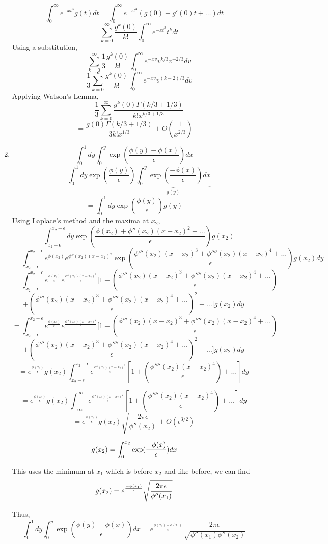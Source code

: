 \documentclass[a4paper]{article}
\begin{document}
\begin{enumerate}
	\[ \int_{0}^{\infty} e^{-xt^3}g(t)dt = \int_{0}^{\infty} e^{-xt^3}(g(0) + g'(0)t +\ldots )dt\]
	\[  = \sum_{k=0}^{\infty} \frac{g^k(0)}{k!}\int_{0}^{\infty} e^{-xt^3}t^k dt\]
Using a substitution,
		\[  = \sum_{k=0}^{\infty}\frac{1}{3} \frac{g^k(0)}{k!}\int_{0}^{\infty} e^{-xv} v^{k/3} v^{-2/3} dv\]
				\[  = \frac{1}{3}\sum_{k=0}^{\infty} \frac{g^k(0)}{k!}\int_{0}^{\infty} e^{-xv} v^{(k-2)/3}  dv\]
Applying Watson's Lemma,
				\[  = \frac{1}{3}\sum_{k=0}^{\infty} \frac{g^k(0) \Gamma(k/3 +1/3) }{k!x^{k/3+ 1/3 }}  \]
				\[  = \frac{g(0) \Gamma(k/3 +1/3 ) }{3 k! x^{1/3}} + O(\frac{1}{x^{2/3}})   \]				
\item 
\[\int_0^1 dy \int_0^y \exp(\frac{\phi(y)-\phi(x)}{\epsilon}) dx \]
\[=\int_0^1 dy \exp(\frac{\phi(y)}{\epsilon})\underbrace{\int_0^y \exp(\frac{-\phi(x)}{\epsilon}) dx }_{g(y)}\]
\[=\int_0^1 dy \exp(\frac{\phi(y)}{\epsilon})g(y)\]
Using Laplace's method and the maxima at $x_2$,
\[=\int_{x_2-\epsilon}^{x_2+\epsilon} dy \exp(\frac{\phi(x_2) +\phi''(x_2)(x-x_2)^2 +\ldots }{\epsilon})g(x_2)\]
\[=\int_{x_2-\epsilon}^{x_2+\epsilon}  e^{\phi(x_2)}e^{\phi''(x_2)(x-x_2)^2 }\exp(\frac{\phi'''(x_2)(x-x_2)^3 +\phi''''(x_2)(x-x_2)^4 +\ldots }{\epsilon})g(x_2) dy\]
\[=\int_{x_2-\epsilon}^{x_2+\epsilon}  e^{\frac{\phi(x_2)}{\epsilon}}e^{\frac{\phi''(x_2)(x-x_2)^2 }{\epsilon}}[1+ (\frac{\phi'''(x_2)(x-x_2)^3 +\phi''''(x_2)(x-x_2)^4 +\ldots }{\epsilon})  \]
\[+ (\frac{\phi'''(x_2)(x-x_2)^3 +\phi''''(x_2)(x-x_2)^4 +\ldots }{\epsilon})^2  +\ldots ]g(x_2) dy\ \]
\[=\int_{x_2-\epsilon}^{x_2+\epsilon} e^{\frac{\phi(x_2)}{\epsilon}}e^{\frac{\phi''(x_2)(x-x_2)^2 }{\epsilon}}[1+ (\frac{\phi'''(x_2)(x-x_2)^3 +\phi''''(x_2)(x-x_2)^4 +\ldots }{\epsilon})  \]
\[+ (\frac{\phi'''(x_2)(x-x_2)^3 +\phi''''(x_2)(x-x_2)^4 +\ldots }{\epsilon})^2  +\ldots ]g(x_2) dy\ \]
\[= e^{\frac{\phi(x_2)}{\epsilon}} g(x_2) \int_{x_2-\epsilon}^{x_2+\epsilon} e^{\frac{\phi''(x_2)(x-x_2)^2 }{\epsilon}}[1+ (\frac{ \phi''''(x_2)(x-x_2)^4  }{\epsilon}) +\ldots ] dy\ \]

\[= e^{\frac{\phi(x_2)}{\epsilon}} g(x_2) \int_{-\infty}^{\infty} e^{\frac{\phi''(x_2)(x-x_2)^2 }{\epsilon}}[1+ (\frac{ \phi''''(x_2)(x-x_2)^4  }{\epsilon}) +\ldots ] dy\ \]
\[= e^{\frac{\phi(x_2)}{\epsilon}} g(x_2) \sqrt{\frac{2\pi \epsilon}{\phi''(x_2)}} + O(\epsilon^{3/2})\ \]

\[ g(x_2) = \int_0^{x_2} \exp(\frac{-\phi(x)}{\epsilon}) dx\\ \]


This uses the minimum at $x_1$ which is before $x_2$ and like before, we can find
\[ g(x_2) = e^{\frac{-\phi(x_1)}{\epsilon}}  \sqrt{\frac{2\pi \epsilon}{\phi''(x_1)}}\\ \]

Thus, 
\[\int_0^1 dy \int_0^y \exp(\frac{\phi(y)-\phi(x)}{\epsilon}) dx  =  e^{\frac{\phi(x_2)-\phi(x_1)}{\epsilon}}  \frac{2\pi \epsilon}{\sqrt{\phi''(x_1)\phi''(x_2)}}\]
\end{enumerate}
\end{document}
